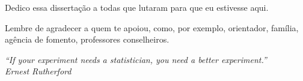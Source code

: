 \begin{dedicatoria}
    \vspace*{\fill}
    \hfill
    \begin{minipage}{.6\textwidth}
     Dedico essa dissertação a todas que lutaram para que eu estivesse aqui. %
    \end{minipage}
\end{dedicatoria}
 
\begin{agradecimentos}
    Lembre de agradecer a quem te apoiou, como, por exemplo, orientador,
    família, agência de fomento, professores conselheiros. %
\end{agradecimentos}

\begin{epigrafe}
\vspace*{\fill}

\begin{flushright}
    \hspace{7.5cm}
    \textit{
        ``If your experiment needs a statistician, you need a better
        experiment.''} \\
        \textit{Ernest Rutherford} %
\end{flushright}
\end{epigrafe}
